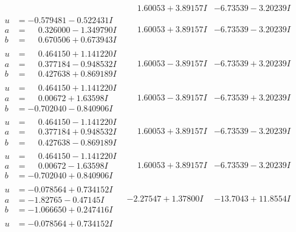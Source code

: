 \documentclass[1p]{elsarticle_modified}
\theoremstyle{definition}
\begin{document}
$$\begin{array}{c|c|c}
 & \phantom{-}1.60053 + 3.89157 I & -6.73539 - 3.20239 I \\ \hline\begin{aligned}
u &= -0.579481 - 0.522431 I \\
a &= \phantom{-}0.326000 - 1.349790 I \\
b &= \phantom{-}0.670506 + 0.673943 I\end{aligned}
 & \phantom{-}1.60053 + 3.89157 I & -6.73539 - 3.20239 I \\ \hline\begin{aligned}
u &= \phantom{-}0.464150 + 1.141220 I \\
a &= \phantom{-}0.377184 - 0.948532 I \\
b &= \phantom{-}0.427638 + 0.869189 I\end{aligned}
 & \phantom{-}1.60053 - 3.89157 I & -6.73539 + 3.20239 I \\ \hline\begin{aligned}
u &= \phantom{-}0.464150 + 1.141220 I \\
a &= \phantom{-}0.00672 + 1.63598 I \\
b &= -0.702040 - 0.840906 I\end{aligned}
 & \phantom{-}1.60053 - 3.89157 I & -6.73539 + 3.20239 I \\ \hline\begin{aligned}
u &= \phantom{-}0.464150 - 1.141220 I \\
a &= \phantom{-}0.377184 + 0.948532 I \\
b &= \phantom{-}0.427638 - 0.869189 I\end{aligned}
 & \phantom{-}1.60053 + 3.89157 I & -6.73539 - 3.20239 I \\ \hline\begin{aligned}
u &= \phantom{-}0.464150 - 1.141220 I \\
a &= \phantom{-}0.00672 - 1.63598 I \\
b &= -0.702040 + 0.840906 I\end{aligned}
 & \phantom{-}1.60053 + 3.89157 I & -6.73539 - 3.20239 I \\ \hline\begin{aligned}
u &= -0.078564 + 0.734152 I \\
a &= -1.82765 - 0.47145 I \\
b &= -1.066650 + 0.247416 I\end{aligned}
 & -2.27547 + 1.37800 I & -13.7043 + 11.8554 I \\ \hline\begin{aligned}
u &= -0.078564 + 0.734152 I \\

\end{aligned}
\end{array}$$
\end{document}
